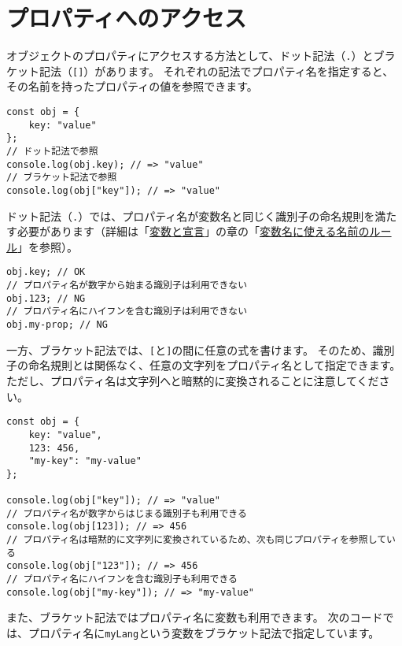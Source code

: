 \hypertarget{property-access}{%
\section{プロパティへのアクセス}\label{property-access}}

オブジェクトのプロパティにアクセスする方法として、ドット記法（\texttt{.}）とブラケット記法（\texttt{[]}）があります。
それぞれの記法でプロパティ名を指定すると、その名前を持ったプロパティの値を参照できます。

\enlargethispage{\baselineskip}\begin{lstlisting}
const obj = {
    key: "value"
};
// ドット記法で参照
console.log(obj.key); // => "value"
// ブラケット記法で参照
console.log(obj["key"]); // => "value"
\end{lstlisting}

ドット記法（\texttt{.}）では、プロパティ名が変数名と同じく識別子の命名規則を満たす必要があります（詳細は「\hyperlink{variable-and-declaration}{変数と宣言}」の章の「\hyperlink{variable-name}{変数名に使える名前のルール}」を参照）。

\begin{lstlisting}
obj.key; // OK
// プロパティ名が数字から始まる識別子は利用できない
obj.123; // NG
// プロパティ名にハイフンを含む識別子は利用できない
obj.my-prop; // NG
\end{lstlisting}

一方、ブラケット記法では、\texttt{[}と\texttt{]}の間に任意の式を書けます。
そのため、識別子の命名規則とは関係なく、任意の文字列をプロパティ名として指定できます。
ただし、プロパティ名は文字列へと暗黙的に変換されることに注意してください。

\begin{lstlisting}
const obj = {
    key: "value",
    123: 456,
    "my-key": "my-value"
};

console.log(obj["key"]); // => "value"
// プロパティ名が数字からはじまる識別子も利用できる
console.log(obj[123]); // => 456
// プロパティ名は暗黙的に文字列に変換されているため、次も同じプロパティを参照している
console.log(obj["123"]); // => 456
// プロパティ名にハイフンを含む識別子も利用できる
console.log(obj["my-key"]); // => "my-value"
\end{lstlisting}

また、ブラケット記法ではプロパティ名に変数も利用できます。
次のコードでは、プロパティ名に\texttt{myLang}という変数をブラケット記法で指定しています。

